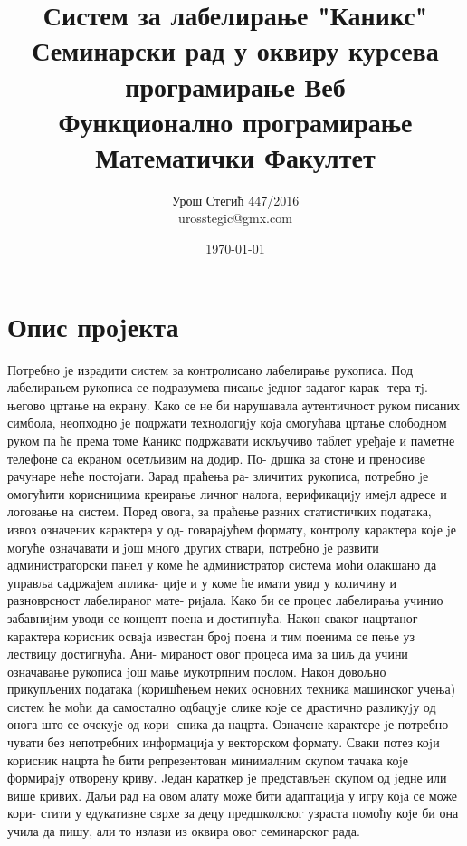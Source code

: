 \documentclass[a4paper]{article}
\begin{document}
\title{
Систем за лабелирање "Каникс"\\
\small{
	Семинарски рад у оквиру курсева\\
	програмирање Веб\\
	Функционално програмирање\\
	Математички Факултет
	}
}

\author{Урош Стегић 447/2016\\ urosstegic@gmx.com}
\date{\today}
\maketitle

\tableofcontents
\clearpage

\section{Опис проjекта}
Потребно jе израдити систем за контролисано лабелирање рукописа.
Под лабелирањем рукописа се подразумева писање jедног задатог карак-
тера тj. његово цртање на екрану. Како се не би нарушавала аутентичност
руком писаних симбола, неопходно jе подржати технологиjу коjа омогућава
цртање слободном руком па ће према томе Каникс подржавати искључиво
таблет уређаjе и паметне телефоне са екраном осетљивим на додир. По-
дршка за стоне и преносиве рачунаре неће постоjати. Зарад праћења ра-
зличитих рукописа, потребно jе омогућити корисницима креирање личног
налога, верификациjу имеjл адресе и логовање на систем. Поред овога, за
праћење разних статистичких података, извоз означених карактера у од-
говараjућем формату, контролу карактера коjе jе могуће означавати и jош
много других ствари, потребно jе развити администраторски панел у коме
ће администратор система моћи олакшано да управља садржаjем аплика-
циjе и у коме ће имати увид у количину и разноврсност лабелираног мате-
риjала. Како би се процес лабелирања учинио забавниjим уводи се концепт
поена и достигнућа. Након сваког нацртаног карактера корисник осваjа
известан броj поена и тим поенима се пење уз лествицу достигнућа. Ани-
мираност овог процеса има за циљ да учини означавање рукописа jош мање
мукотрпним послом. Након довољно прикупљених података (коришћењем
неких основних техника машинског учења) систем ће моћи да самостално
одбацуjе слике коjе се драстично разликуjу од онога што се очекуjе од кори-
сника да нацрта. Означене карактере jе потребно чувати без непотребних
информациjа у векторском формату. Сваки потез коjи корисник нацрта ће
бити репрезентован минималним скупом тачака коjе формираjу отворену
криву. Jедан караткер jе представљен скупом од jедне или више кривих.
Даљи рад на овом алату може бити адаптациjа у игру коjа се може кори-
стити у едукативне сврхе за децу предшколског узраста помоћу коjе би она
учила да пишу, али то излази из оквира овог семинарског рада.
\end{document}
